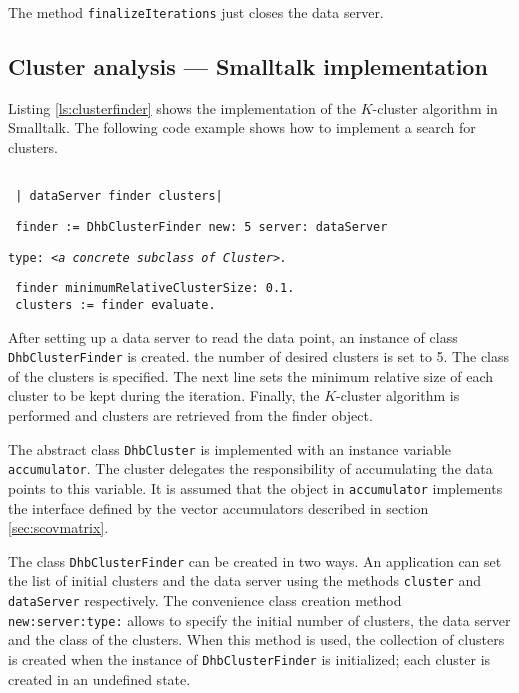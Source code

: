 \documentclass[twoside]{book}
\begin{document}
\noindent The method {\tt finalizeIterations} just closes the data
server.

\subsection{Cluster analysis --- Smalltalk implementation}
Listing \ref{ls:clusterfinder} shows the implementation of the
$K$-cluster algorithm in Smalltalk. The following code example
shows how to implement a search for clusters.
\begin{codeExample}
\begin{verbatim}

 | dataServer finder clusters|
\end{verbatim}
\begin{verbatim}
 finder := DhbClusterFinder new: 5 server: dataServer
\end{verbatim}
\hfil{\tt type: <\sl a concrete subclass of \tt Cluster>.}
\begin{verbatim}
 finder minimumRelativeClusterSize: 0.1.
 clusters := finder evaluate.
\end{verbatim}
\end{codeExample}
After setting up a data server to read the data point, an instance
of class {\tt DhbClusterFinder} is created. the number of desired
clusters is set to 5. The class of the clusters is specified. The
next line sets the minimum relative size of each cluster to be
kept during the iteration. Finally, the $K$-cluster algorithm is
performed and clusters are retrieved from the finder object.

The abstract class {\tt DhbCluster} is implemented with an
instance variable {\tt accumulator}. The cluster delegates the
responsibility of accumulating the data points to this variable.
It is assumed that the object in {\tt accumulator} implements the
interface defined by the vector accumulators described in section
\ref{sec:scovmatrix}.

The class {\tt DhbClusterFinder} can be created in two ways. An
application can set the list of initial clusters and the data
server using the methods {\tt cluster} and {\tt dataServer}
respectively. The convenience class creation method {\tt
new:server:type:} allows to specify the initial number of
clusters, the data server and the class of the clusters. When this
method is used, the collection of clusters is created when the
instance of {\tt DhbClusterFinder} is initialized; each cluster is
created in an undefined state.
\end{document}
